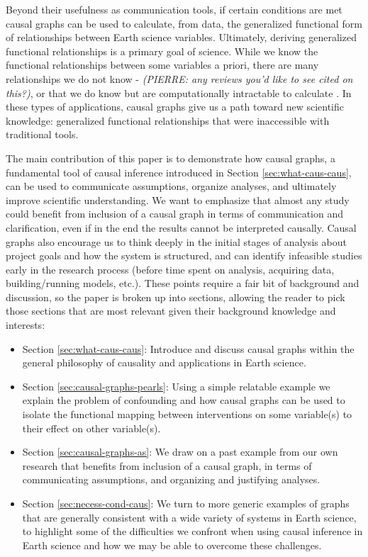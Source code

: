 \documentclass[12pt]{article}
\begin{document}
Beyond their usefulness as communication tools, if certain conditions
are met causal graphs can be used to calculate, from data, the
generalized functional form of relationships between Earth science
variables. Ultimately, deriving generalized functional relationships
is a primary goal of science. While we know the functional
relationships between some variables a priori, there are many
relationships we do not know \citep[e.g., ecosystem scale water and
carbon fluxes;][]{massmann2019} - \textit{(PIERRE: any reviews you'd
  like to see cited on this?)}, or that we do know but are
computationally intractable to calculate \citep[e.g., clouds and
microphysics at the global scale:][]{randall2003, gentine2018,
  zadra2018} . In these types of applications, causal graphs give us a
path toward new scientific knowledge: generalized functional
relationships that were inaccessible with traditional tools.

The main contribution of this paper is to demonstrate how causal
graphs, a fundamental tool of causal inference introduced in Section
\ref{sec:what-caus-caus}, can be used to communicate assumptions,
organize analyses, and ultimately improve scientific understanding. We
want to emphasize that almost any study could benefit from inclusion
of a causal graph in terms of communication and clarification, even if
in the end the results cannot be interpreted causally. Causal graphs
also encourage us to think deeply in the initial stages of analysis
about project goals and how the system is structured, and can identify
infeasible studies early in the research process (before time spent on
analysis, acquiring data, building/running models, etc.). These points
require a fair bit of background and discussion, so the paper is
broken up into sections, allowing the reader to pick those sections
that are most relevant given their background knowledge and interests:

\begin{itemize}
\item Section \ref{sec:what-caus-caus}: Introduce and discuss causal graphs within the
  general philosophy of causality and applications in Earth science.
\item Section \ref{sec:causal-graphs-pearls}: Using a simple relatable
  example we explain the problem of confounding and how causal graphs
  can be used to isolate the functional mapping between interventions
  on some variable(s) to their effect on other variable(s).
\item Section \ref{sec:causal-graphs-as}: We draw on a past example
  from our own research that benefits from inclusion of a causal
  graph, in terms of communicating assumptions, and organizing and
  justifying analyses.
\item Section \ref{sec:necess-cond-caus}: We turn to more generic
  examples of graphs that are generally consistent with a wide
  variety of systems in Earth science, to highlight some of the
  difficulties we confront when using causal inference in Earth
  science and how we may be able to overcome these challenges.
\end{itemize}
\end{document}

